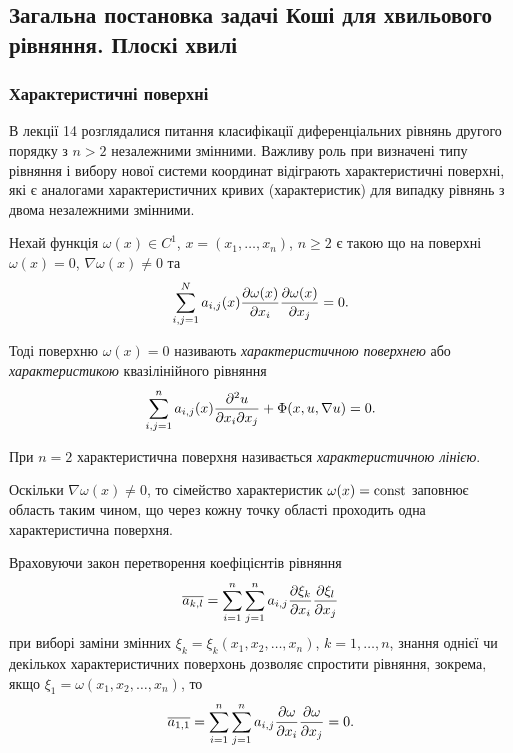 \subsection{Загальна постановка задачі Коші для хвильового рівняння. Плоскі хвилі}

\subsubsection{Характеристичні поверхні}

В лекції 14 розглядалися питання класифікації диференціальних рівнянь другого порядку з $n > 2$ незалежними змінними. Важливу роль при визначені типу рівняння і вибору нової системи координат відіграють характеристичні поверхні, які є аналогами характеристичних кривих (характеристик) для випадку рівнянь з двома незалежними змінними. \medskip

Нехай функція $\omega(x) \in C^1$, $x = (x_1, \ldots, x_n)$, $n \ge 2$ є такою що на поверхні $\omega(x) = 0$, $\nabla \omega(x) \ne 0$ та
\begin{equation}
    \label{eq:omega-partial-system-of-linear-equations}
    \displaystyle\sum\limits_{i, j = 1}^N a_{i,j}(x) \frac{\partial \omega(x)}{\partial x_i} \frac{\partial \omega(x)}{\partial x_j} = 0.
\end{equation}

\begin{definition}
    Тоді поверхню $\omega(x) = 0$ називають \textit{характеристичною поверхнею} або \textit{характеристикою} квазілінійного рівняння
    \begin{equation}
        \displaystyle\sum\limits_{i, j = 1}^n a_{i, j}(x) \frac{\partial^2 u}{\partial x_i \partial x_j} + \Phi(x, u, \nabla u) = 0.
    \end{equation}
\end{definition}

\begin{definition}
    При $n = 2$ характеристична поверхня називається \textit{характеристичною лінією}.
\end{definition}

Оскільки $\nabla \omega(x) \ne 0$, то сімейство характеристик $\omega(x) = \operatorname{const}$ заповнює область таким чином, що через кожну точку області проходить одна характеристична поверхня. \medskip

Враховуючи закон перетворення коефіцієнтів рівняння
\begin{equation}
    \overline{a_{k, l}} = \displaystyle\sum\limits_{i = 1}^n \displaystyle\sum\limits_{j = 1}^n a_{i, j} \frac{\partial \xi_k}{\partial x_i} \frac{\partial \xi_l}{\partial x_j}
\end{equation}
при виборі заміни змінних $\xi_k = \xi_k(x_1, x_2, \ldots, x_n)$, $k = 1, \ldots, n$, знання однієї чи декількох характеристичних поверхонь дозволяє спростити рівняння, зокрема, якщо $\xi_1 = \omega(x_1, x_2, \ldots, x_n)$, то
\begin{equation}
    \overline{a_{1, 1}} = \displaystyle\sum\limits_{i = 1}^n \displaystyle\sum\limits_{j = 1}^n a_{i, j} \frac{\partial \omega}{\partial x_i} \frac{\partial \omega}{\partial x_j} = 0.
\end{equation}

